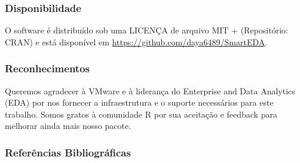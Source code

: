 \documentclass[
]{article}
\begin{document}
\hypertarget{disponibilidade}{%
\subsubsection{Disponibilidade}\label{disponibilidade}}

O software é distribuído sob uma LICENÇA de arquivo MIT + (Repositório:
CRAN) e está disponível em \url{https://github.com/daya6489/SmartEDA}.

\hypertarget{reconhecimentos}{%
\subsubsection{Reconhecimentos}\label{reconhecimentos}}

Queremos agradecer à VMware e à liderança do Enterprise and Data
Analytics (EDA) por nos fornecer a infraestrutura e o suporte
necessários para este trabalho. Somos gratos à comunidade R por sua
aceitação e feedback para melhorar ainda mais nosso pacote.

\hypertarget{referuxeancias-bibliogruxe1ficas}{%
\subsubsection{Referências
Bibliográficas}\label{referuxeancias-bibliogruxe1ficas}}
\end{document}
